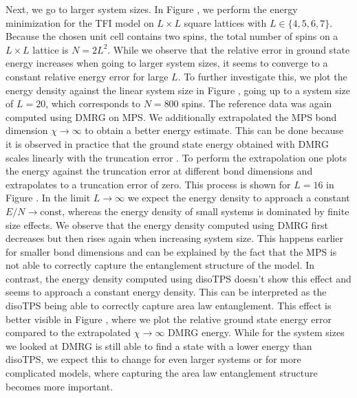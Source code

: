 Next, we go to larger system sizes. In Figure , we perform the energy minimization for the TFI model on $L\times L$ square lattices with $L\in\{4,5,6,7\}$. Because the chosen unit cell contains two spins, the total number of spins on a $L\times L$ lattice is $N = 2L^2$. While we observe that the relative error in ground state energy increases when going to larger system sizes, it seems to converge to a constant relative energy error for large $L$. To further investigate this, we plot the energy density against the linear system size in Figure , going up to a system size of $L = 20$, which corresponds to $N = 800$ spins. The reference data was again computed using DMRG on MPS. We additionally extrapolated the MPS bond dimension $\chi\rightarrow\infty$ to obtain a better energy estimate. This can be done because it is observed in practice that the ground state energy obtained with DMRG scales linearly with the truncation error \cite{cite:accuracy_of_DMRG}. To perform the extrapolation one plots the energy against the truncation error at different bond dimensions and extrapolates to a truncation error of zero. This process is shown for $L=16$ in Figure \figref{}. In the limit $L\rightarrow\infty$ we expect the energy density to approach a constant $E/N\rightarrow \text{const}$, whereas the energy density of small systems is dominated by finite size effects. We observe that the energy density computed using DMRG first decreases but then rises again when increasing system size. This happens earlier for smaller bond dimensions and can be explained by the fact that the MPS is not able to correctly capture the entanglement structure of the model. In contrast, the energy density computed using disoTPS doesn't show this effect and seems to approach a constant energy density. This can be interpreted as the disoTPS being able to correctly capture area law entanglement. This effect is better visible in Figure , where we plot the relative ground state energy error compared to the extrapolated $\chi\rightarrow\infty$ DMRG energy. While for the system sizes we looked at DMRG is still able to find a state with a lower energy than disoTPS, we expect this to change for even larger systems or for more complicated models, where capturing the area law entanglement structure becomes more important. \par
%

